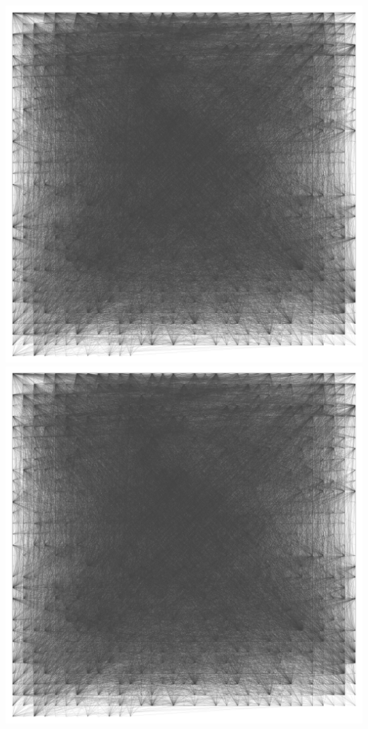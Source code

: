 \documentclass[12pt, a4paper]{article}
\begin{document}
\begin{multicols}{2}
  {\centering
  \includegraphics[width=\columnwidth]{src/youtube/hdg/comp/3_plot_grd}\\
  \label{fig:hdg_c3}}
  {\centering
  \includegraphics[width=\columnwidth]{src/youtube/hdg/comp/4_plot_frgrid}\\
  \label{fig:hdg_c4}}
\end{multicols}
\end{document}
